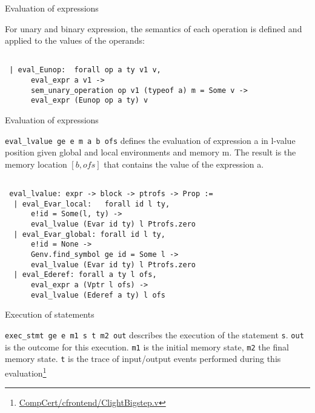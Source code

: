 \documentclass{beamer}
\begin{document}
 \begin{frame}[fragile]{Evaluation of expressions}

  For unary and binary expression, the semantics of each operation is defined and applied to the values of the operands:
  
    \begin{lstlisting}[language=Coq]
   
 | eval_Eunop:  forall op a ty v1 v,
      eval_expr a v1 ->
      sem_unary_operation op v1 (typeof a) m = Some v ->
      eval_expr (Eunop op a ty) v
\end{lstlisting}
\end{frame}


 \begin{frame}[fragile]{Evaluation of expressions}

\texttt{eval\_lvalue ge e m a b ofs} defines the evaluation of expression a
  in l-value position given global and local environments and memory m.  The result is the memory location $[b, ofs]$
  that contains the value of the expression a.
  
    \begin{lstlisting}[language=Coq]
   
 eval_lvalue: expr -> block -> ptrofs -> Prop :=
  | eval_Evar_local:   forall id l ty,
      e!id = Some(l, ty) ->
      eval_lvalue (Evar id ty) l Ptrofs.zero
  | eval_Evar_global: forall id l ty,
      e!id = None ->
      Genv.find_symbol ge id = Some l ->
      eval_lvalue (Evar id ty) l Ptrofs.zero
  | eval_Ederef: forall a ty l ofs,
      eval_expr a (Vptr l ofs) ->
      eval_lvalue (Ederef a ty) l ofs
\end{lstlisting}
\end{frame}


\begin{frame}{Execution of statements}
  
     \texttt{exec\_stmt ge e m1 s t m2 out} describes the execution of
  the statement \texttt{s}.  \texttt{out} is the outcome for this execution.
  \texttt{m1} is the initial memory state, \texttt{m2} the final memory state.
  \texttt{t} is the trace of input/output events performed during this
  evaluation\footnote{\url{CompCert/cfrontend/ClightBigstep.v}}
\end{frame}
\end{document}
